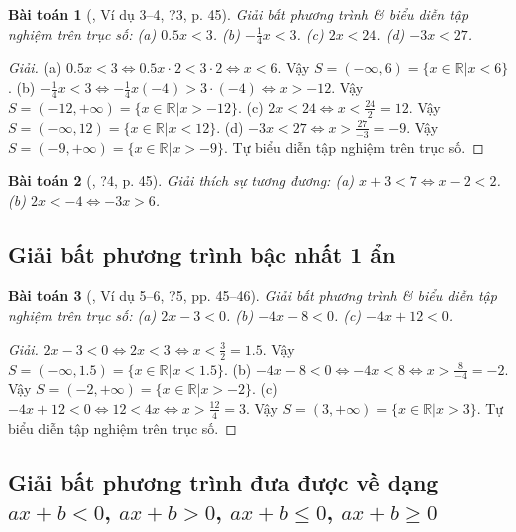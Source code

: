 \documentclass{article}
\newtheorem{baitoan}{Bài toán}
\begin{document}
\begin{baitoan}[\cite{SGK_Toan_8_tap_2}, Ví dụ 3--4, ?3, p. 45]
	Giải bất phương trình \& biểu diễn tập nghiệm trên trục số: (a) $0.5x < 3$. (b) $-\frac{1}{4}x < 3$. (c) $2x < 24$. (d) $-3x < 27$.
\end{baitoan}

\begin{proof}[Giải]
	(a) $0.5x < 3\Leftrightarrow0.5x\cdot2 < 3\cdot2\Leftrightarrow x < 6$. Vậy $S = (-\infty,6) = \{x\in\mathbb{R}|x < 6\}$. (b) $-\frac{1}{4}x < 3\Leftrightarrow-\frac{1}{4}x(-4) > 3\cdot(-4)\Leftrightarrow x > -12$. Vậy $S = (-12,+\infty) = \{x\in\mathbb{R}|x > -12\}$. (c) $2x < 24\Leftrightarrow x < \frac{24}{2} = 12$. Vậy $S = (-\infty,12) = \{x\in\mathbb{R}|x < 12\}$. (d) $-3x < 27\Leftrightarrow x > \frac{27}{-3} = -9$. Vậy $S = (-9,+\infty) = \{x\in\mathbb{R}|x > -9\}$. Tự biểu diễn tập nghiệm trên trục số.
\end{proof}

\begin{baitoan}[\cite{SGK_Toan_8_tap_2}, ?4, p. 45]
	Giải thích sự tương đương: (a) $x + 3 < 7\Leftrightarrow x - 2 < 2$. (b) $2x < -4\Leftrightarrow-3x > 6$.
\end{baitoan}

\subsection{Giải bất phương trình bậc nhất 1 ẩn}

\begin{baitoan}[\cite{SGK_Toan_8_tap_2}, Ví dụ 5--6, ?5, pp. 45--46]
	Giải bất phương trình \& biểu diễn tập nghiệm trên trục số: (a) $2x - 3 < 0$. (b) $-4x - 8 < 0$. (c) $-4x + 12 < 0$.
\end{baitoan}

\begin{proof}[Giải]
	$2x - 3 < 0\Leftrightarrow 2x < 3\Leftrightarrow x < \frac{3}{2} = 1.5$. Vậy $S = (-\infty,1.5) = \{x\in\mathbb{R}|x < 1.5\}$. (b) $-4x - 8 < 0\Leftrightarrow-4x < 8\Leftrightarrow x > \frac{8}{-4} = -2$. Vậy $S = (-2,+\infty) = \{x\in\mathbb{R}|x > -2\}$. (c) $-4x + 12 < 0\Leftrightarrow12 < 4x\Leftrightarrow x > \frac{12}{4} = 3$. Vậy $S = (3,+\infty) = \{x\in\mathbb{R}|x > 3\}$. Tự biểu diễn tập nghiệm trên trục số.
\end{proof}

\subsection{Giải bất phương trình đưa được về dạng $ax + b < 0$, $ax + b > 0$, $ax + b\le0$, $ax + b\ge0$}
\end{document}
